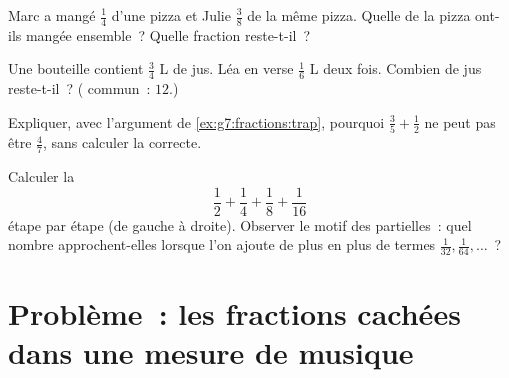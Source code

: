 \begin{exercise}[$\star\star$]\label{exo:g7:fractions:9}
Marc a mangé $\frac14$ d'une pizza et Julie $\frac38$ de la même
pizza. Quelle  de la pizza ont-ils mangée ensemble~? Quelle
fraction reste-t-il~?
\end{exercise}

\begin{exercise}[$\star\star$]\label{exo:g7:fractions:10}
Une bouteille contient $\frac34$ L de jus. Léa en verse $\frac16$ L
deux fois. Combien de jus reste-t-il~? ( commun~: $12$.)
\end{exercise}

\begin{exercise}[$\star\star$]\label{exo:g7:fractions:11}
Expliquer, avec l'argument de \cref{ex:g7:fractions:trap}, pourquoi
$\frac35 + \frac12$ ne peut pas être $\frac{4}{7}$, sans calculer la
 correcte.
\end{exercise}

\begin{exercise}[$\star\star\star$]\label{exo:g7:fractions:12}
Calculer la 
\[
\frac12 + \frac14 + \frac18 + \frac{1}{16}
\]
étape par étape (de gauche à droite). Observer le motif des 
partielles~: quel nombre approchent-elles lorsque l'on ajoute de plus
en plus de termes $\frac{1}{32}, \frac{1}{64}, \dots$~?
\end{exercise}

\section{Problème~: les fractions cachées dans une mesure de musique}


